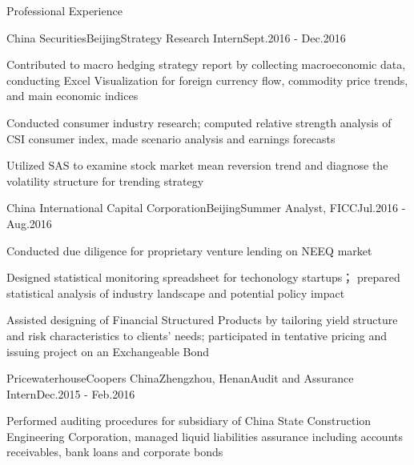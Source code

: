 \documentclass{resume02} %
\begin{document}
\begin{rSection}{Professional Experience}

\begin{rSubsection}{China Securities}{Beijing}{Strategy Research Intern}{Sept.2016 - Dec.2016}
\item Contributed to macro hedging strategy report by collecting macroeconomic data, conducting Excel Visualization for foreign currency flow, commodity price trends, and main economic indices
\item Conducted consumer industry research; computed relative strength analysis of CSI consumer index, made scenario analysis and earnings forecasts
\item Utilized SAS to examine stock market mean reversion trend and diagnose the volatility structure for trending strategy
\end{rSubsection}


\begin{rSubsection}{China International Capital Corporation}{Beijing}{Summer Analyst, FICC}{Jul.2016 - Aug.2016}
\item Conducted due diligence for proprietary venture lending on NEEQ market
\item Designed statistical monitoring spreadsheet for techonology startups； prepared statistical analysis of industry landscape and potential policy impact
\item Assisted designing of Financial Structured Products by tailoring yield structure and risk characteristics to clients' needs; participated in tentative pricing and issuing project on an Exchangeable Bond
\end{rSubsection}


\begin{rSubsection}{PricewaterhouseCoopers China}{Zhengzhou, Henan}{Audit and Assurance Intern}{Dec.2015 - Feb.2016}
\item Performed auditing procedures for subsidiary of China State Construction Engineering Corporation, managed liquid liabilities assurance including accounts receivables, bank loans and corporate bonds
\end{rSubsection}

\end{rSection}


\end{document}
